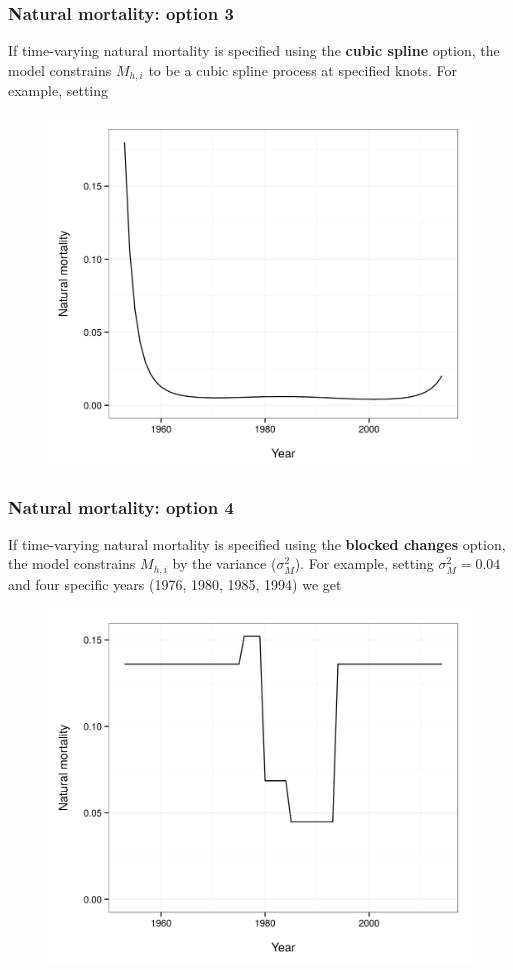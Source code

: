 \documentclass{beamer}
\begin{document}
\begin{frame}
\frametitle{Natural mortality: option 3}
If time-varying natural mortality is specified using the {\bf cubic spline}
option, the model constrains $M_{h,i}$ to be a cubic spline process at
specified knots. For example, setting
\begin{figure}[!htbp]
  \centering
  \includegraphics[width=0.65\linewidth]{figure/M_t_spline.png}
\end{figure}
\end{frame}


\begin{frame}
\frametitle{Natural mortality: option 4}
If time-varying natural mortality is specified using the {\bf blocked changes}
option, the model constrains $M_{h,i}$ by the variance ($\sigma^2_M$). For
example, setting $\sigma^2_M = 0.04$ and four specific years (1976, 1980, 1985,
1994) we get
\begin{figure}[!htbp]
  \centering
  \includegraphics[width=0.65\linewidth]{figure/M_t_block.png}
\end{figure}
\end{frame}
\end{document}
